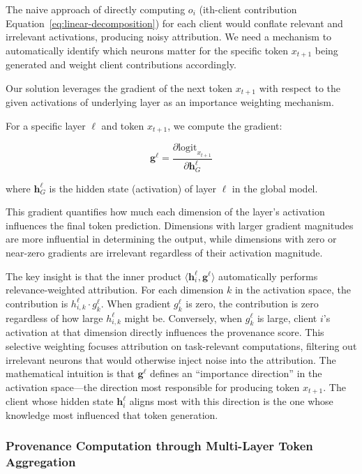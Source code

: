 The naive approach of directly computing $o_{i}$ (\ie ith-client contribution Equation~\ref{eq:linear-decomposition}) for each client would conflate relevant and irrelevant activations, producing noisy attribution.
We need a mechanism to automatically identify which neurons matter for the specific token $x_{t+1}$ being generated and weight client contributions accordingly.

Our solution leverages the gradient of the next token $x_{t+1}$ with respect to the given activations of underlying layer as an importance weighting mechanism.

For a specific layer $\ell$ and token $x_{t+1}$, we compute the gradient:

\begin{equation}
  \label{eq:gradient}
  \mathbf{g}^\ell = \frac{\partial \text{logit}_{x_{t+1}}}{\partial \mathbf{h}_G^\ell}
\end{equation}

where $\mathbf{h}_G^\ell$ is the hidden state (activation) of layer $\ell$ in the global model.

This gradient quantifies how much each dimension of the layer's activation influences the final token prediction.
Dimensions with larger gradient magnitudes are more influential in determining the output, while dimensions with zero or near-zero gradients are irrelevant regardless of their activation magnitude.

The key insight is that the inner product $\langle \mathbf{h}_{i}^\ell, \mathbf{g}^\ell \rangle$ automatically performs relevance-weighted attribution.
For each dimension $k$ in the activation space, the contribution is $h_{i,k}^\ell \cdot g_k^\ell$.
When gradient $g_k^\ell$ is zero, the contribution is zero regardless of how large $h_{i,k}^\ell$ might be.
Conversely, when $g_k^\ell$ is large, client $i$'s activation at that dimension directly influences the provenance score.
This selective weighting focuses attribution on task-relevant computations, filtering out irrelevant neurons that would otherwise inject noise into the attribution.
The mathematical intuition is that $\mathbf{g}^\ell$ defines an ``importance direction'' in the activation space---the direction most responsible for producing token $x_{t+1}$.
The client whose hidden state $\mathbf{h}_{i}^\ell$ aligns most with this direction is the one whose knowledge most influenced that token generation.

\subsubsection{Provenance Computation through Multi-Layer Token Aggregation}

